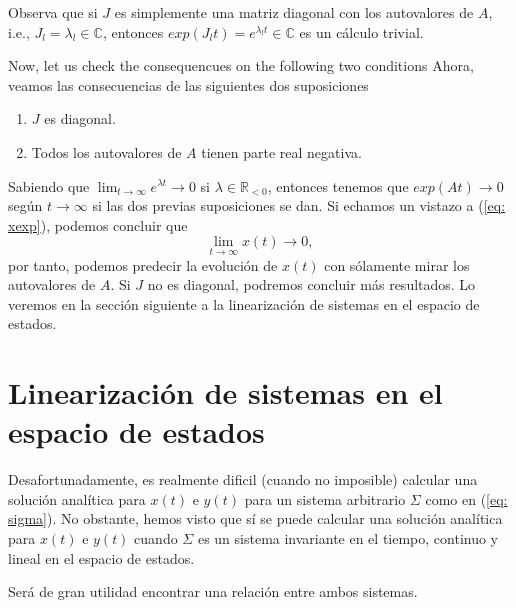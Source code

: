 Observa que si $J$ es simplemente una matriz diagonal con los autovalores de $A$, i.e., $J_l = \lambda_l \in \mathbb{C}$, entonces $exp(J_lt) = e^{\lambda_lt} \in\mathbb{C}$ es un cálculo trivial.

Now, let us check the consequencues on the following two conditions
Ahora, veamos las consecuencias de las siguientes dos suposiciones
\begin{enumerate}
	\item $J$ es diagonal.
	\item Todos los autovalores de $A$ tienen parte real negativa.
\end{enumerate}

Sabiendo que $\lim_{t\to\infty} e^{\lambda t} \to 0$ si $\lambda \in \mathbb{R}_{<0}$, entonces tenemos que $exp(At) \to 0$ según $t\to\infty$ si las dos previas suposiciones se dan. Si echamos un vistazo a (\ref{eq: xexp}), podemos concluir que 
\begin{equation}
	\lim_{t\to\infty} x(t) \to 0,
	\label{eq: xlim}
\end{equation}
por tanto, podemos predecir la evolución de $x(t)$ con sólamente mirar los autovalores de $A$. Si $J$ no es diagonal, podremos concluir más resultados. Lo veremos en la sección siguiente a la linearización de sistemas en el espacio de estados.


\section{Linearización de sistemas en el espacio de estados}\label{sec: linear}
Desafortunadamente, es realmente dificil (cuando no imposible) calcular una solución analítica para $x(t)$ e $y(t)$ para un sistema arbitrario $\Sigma$ como en (\ref{eq: sigma}). No obstante, hemos visto que sí se puede calcular una solución analítica para $x(t)$ e $y(t)$ cuando $\Sigma$ es un sistema invariante en el tiempo, continuo y lineal en el espacio de estados.

Será de gran utilidad encontrar una relación entre ambos sistemas.

